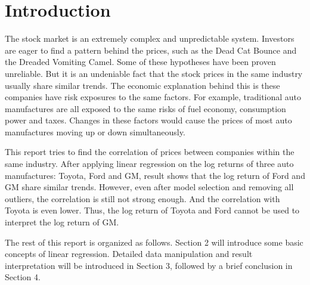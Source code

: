 \documentclass[11pt, conference]{IEEEtran}
\begin{document}
%
\IEEEpeerreviewmaketitle



\section{Introduction}
The stock market is an extremely complex and unpredictable system. Investors are eager to find a pattern behind the prices, such as the Dead Cat Bounce\cite{ref1} and the Dreaded Vomiting Camel\cite{ref2}. Some of these hypotheses have been proven unreliable. But it is an undeniable fact that the stock prices in the same industry usually share similar trends. The economic explanation behind this is these companies have risk exposures to the same factors. For example, traditional auto manufactures are all exposed to the same risks of fuel economy, consumption power and taxes. Changes in these factors would cause the prices of most auto manufactures moving up or down simultaneously. 

This report tries to find the correlation of prices between companies within the same industry. After applying linear regression on the log returns of three auto manufactures: Toyota, Ford and GM, result shows that the log return of Ford and GM share similar trends. However, even after model selection and removing all outliers, the correlation is still not strong enough. And the correlation with Toyota is even lower. Thus, the log return of Toyota and Ford cannot be used to interpret the log return of GM.

The rest of this report is organized as follows. Section 2 will introduce some basic concepts of linear regression. Detailed data manipulation and result interpretation will be introduced in Section 3, followed by a brief conclusion in Section 4.


%
%
\end{document}

